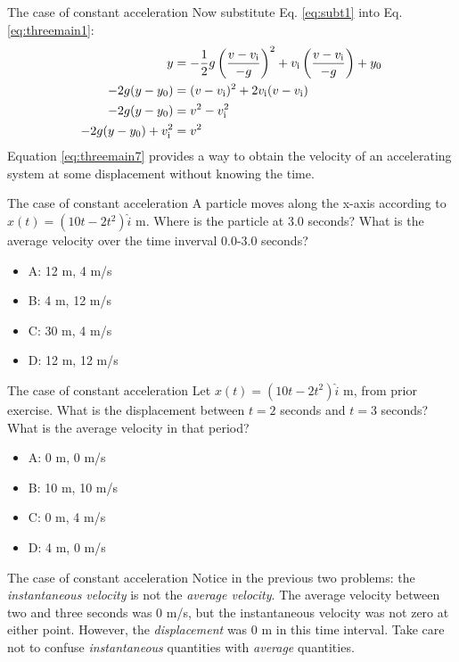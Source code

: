 \documentclass{beamer}
\begin{document}
\begin{frame}{The case of constant acceleration}
Now substitute Eq. \ref{eq:subt1} into Eq. \ref{eq:threemain1}:\\
\begin{align}
y &= -\frac{1}{2}g\left(\frac{v-v_{\rm i}}{-g}\right)^2+v_{\rm i}\left(\frac{v-v_{\rm i}}{-g}\right)+y_{\rm 0} \label{eq:threemain4} \\ 
-2g(y-y_{\rm 0}) &= (v-v_{\rm i})^2 + 2v_{\rm i}(v-v_{\rm i}) \label{eq:threemain5} \\
-2g(y-y_{\rm 0}) &= v^2-v_{\rm i}^2 \label{eq:threemain6} \\
-2g(y-y_{\rm 0})+v_{\rm i}^2 &= v^2 \label{eq:threemain7}
\end{align}
Equation \ref{eq:threemain7} provides a way to obtain the velocity of an accelerating system at some displacement without knowing the time.
\end{frame}

\begin{frame}{The case of constant acceleration}
A particle moves along the x-axis according to $x(t) = (10t-2t^2)\hat{i}$ m.  Where is the particle at 3.0 seconds?  What is the average velocity over the time inverval 0.0-3.0 seconds?
\begin{itemize}
\item A: 12 m, 4 m/s
\item B: 4 m, 12 m/s
\item C: 30 m, 4 m/s
\item D: 12 m, 12 m/s
\end{itemize}
\end{frame}

\begin{frame}{The case of constant acceleration}
Let $x(t) = (10t-2t^2)\hat{i}$ m, from prior exercise.  What is the displacement between $t=2$ seconds and $t=3$ seconds?  What is the average velocity in that period?
\begin{itemize}
\item A: 0 m, 0 m/s
\item B: 10 m, 10 m/s
\item C: 0 m, 4 m/s
\item D: 4 m, 0 m/s
\end{itemize}
\end{frame}

\begin{frame}{The case of constant acceleration}
Notice in the previous two problems: the \textit{instantaneous velocity} is not the \textit{average velocity}.  The average velocity between two and three seconds was 0 m/s, but the instantaneous velocity was not zero at either point.  However, the \textit{displacement} was 0 m in this time interval.  Take care not to confuse \textit{instantaneous} quantities with \textit{average} quantities.
\end{frame}
\end{document}
